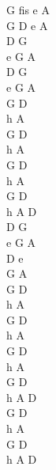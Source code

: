 \begin{chord}
	G fis e A\\
	G D e A\\
	D G\\
	e G A\\
	D G\\
	e G A\\

	G D\\
	h A\\
	G D\\
	h A\\

	G D\\
	h A\\
	G D\\
	h A D\\

	D G\\
	e G A\\
	D e\\
	G A\\

	G D\\
	h A\\
	G D\\
	h A\\

	G D\\
	h A\\
	G D\\
	h A D\\
	
	G D\\
	h A\\
	G D\\
	h A D
\end{chord}
